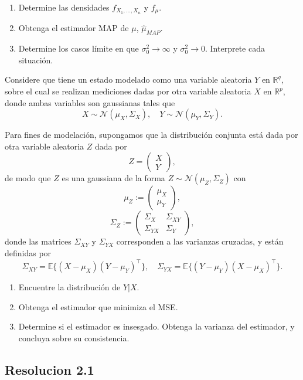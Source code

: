 \documentclass[
  11pt,
  letterpaper,
   addpoints,
  ]{exam}
\begin{document}
\begin{questions}
\begin{enumerate}
    \item Determine las densidades \( f_{X_1, \ldots, X_n} \) y \( f_\mu \).
    \item Obtenga el estimador MAP de \(\mu\), \(\hat{\mu}_{MAP}\).
    \item Determine los casos límite en que \( \sigma_0^2 \to \infty \) y \( \sigma_0^2 \to 0 \). Interprete cada situación.
\end{enumerate}

\question  
Considere que tiene un estado modelado como una variable aleatoria \( Y \) en \( \mathbb{R}^q \), sobre el cual se realizan mediciones dadas por otra variable aleatoria \( X \) en \( \mathbb{R}^p \), donde ambas variables son gaussianas tales que
\[
X \sim \mathcal{N}(\mu_X, \Sigma_X), \quad Y \sim \mathcal{N}(\mu_Y, \Sigma_Y).
\tag{10}
\]

Para fines de modelación, supongamos que la distribución conjunta está dada por otra variable aleatoria \( Z \) dada por
\[
Z = 
\begin{pmatrix}
X \\
Y
\end{pmatrix},
\tag{11}
\]
de modo que \( Z \) es una gaussiana de la forma \( Z \sim \mathcal{N}(\mu_Z, \Sigma_Z) \) con
\[
\mu_Z := 
\begin{pmatrix}
\mu_X \\
\mu_Y
\end{pmatrix},
\tag{12}
\]
\[
\Sigma_Z := 
\begin{pmatrix}
\Sigma_X & \Sigma_{XY} \\
\Sigma_{YX} & \Sigma_Y
\end{pmatrix},
\tag{13}
\]
donde las matrices \( \Sigma_{XY} \) y \( \Sigma_{YX} \) corresponden a las varianzas cruzadas, y están definidas por
\[
\Sigma_{XY} = \mathbb{E}\big\{(X - \mu_X)(Y - \mu_Y)^\top \big\}, \quad 
\Sigma_{YX} = \mathbb{E}\big\{(Y - \mu_Y)(X - \mu_X)^\top \big\}.
\tag{14}
\]

\begin{enumerate}
    \item Encuentre la distribución de \( Y|X \).
    \item Obtenga el estimador que minimiza el MSE.
    \item Determine si el estimador es insesgado. Obtenga la varianza del estimador, y concluya sobre su consistencia.
\end{enumerate}


\begin{solution}
    \subsection*{Resolucion 2.1}
\end{solution}

\end{questions}
\end{document}
